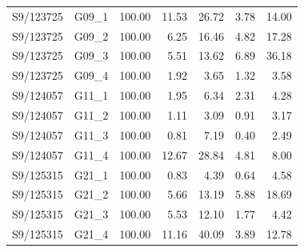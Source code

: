\begin{longtable}{llrrrrr}
S9/123725 & G09\_1 & 100.00 & 11.53 & 26.72 & 3.78 & 14.00 \\
S9/123725 & G09\_2 & 100.00 & 6.25 & 16.46 & 4.82 & 17.28 \\
S9/123725 & G09\_3 & 100.00 & 5.51 & 13.62 & 6.89 & 36.18 \\
S9/123725 & G09\_4 & 100.00 & 1.92 & 3.65 & 1.32 & 3.58 \\
S9/124057 & G11\_1 & 100.00 & 1.95 & 6.34 & 2.31 & 4.28 \\
S9/124057 & G11\_2 & 100.00 & 1.11 & 3.09 & 0.91 & 3.17 \\
S9/124057 & G11\_3 & 100.00 & 0.81 & 7.19 & 0.40 & 2.49 \\
S9/124057 & G11\_4 & 100.00 & 12.67 & 28.84 & 4.81 & 8.00 \\
S9/125315 & G21\_1 & 100.00 & 0.83 & 4.39 & 0.64 & 4.58 \\
S9/125315 & G21\_2 & 100.00 & 5.66 & 13.19 & 5.88 & 18.69 \\
S9/125315 & G21\_3 & 100.00 & 5.53 & 12.10 & 1.77 & 4.42 \\
S9/125315 & G21\_4 & 100.00 & 11.16 & 40.09 & 3.89 & 12.78 \\
\bottomrule
\end{longtable}

